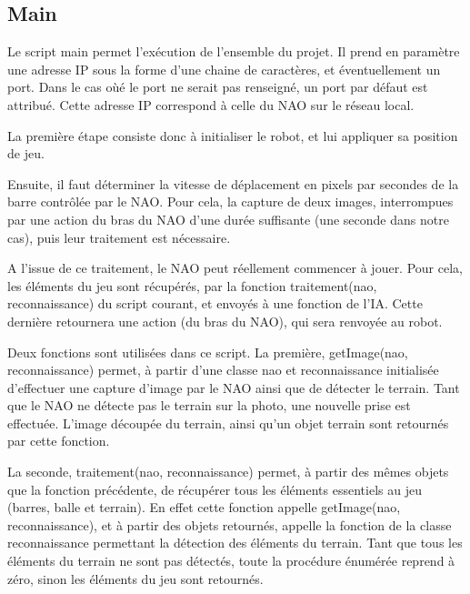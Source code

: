 \subsection{Main}
\label{sub:Main}

  \par Le script main permet l'exécution de l'ensemble du projet.
  Il prend en paramètre une adresse IP sous la forme d'une chaine de caractères, et éventuellement un port.
  Dans le cas oùé le port ne serait pas renseigné, un port par défaut est attribué.
  Cette adresse IP correspond à celle du NAO sur le réseau local.
  \par La première étape consiste donc à initialiser le robot, et lui appliquer sa position de jeu.
  \par Ensuite, il faut déterminer la vitesse de déplacement en pixels par secondes de la barre contrôlée par le NAO.
  Pour cela, la capture de deux images, interrompues par une action du bras du NAO d'une durée suffisante (une seconde dans notre cas), puis leur traitement est nécessaire.
  \par A l'issue de ce traitement, le NAO peut réellement commencer à jouer.
  Pour cela, les éléments du jeu sont récupérés, par la fonction traitement(nao, reconnaissance) du script courant, et envoyés à une fonction de l'IA.
  Cette dernière retournera une action (du bras du NAO), qui sera renvoyée au robot.

  \par Deux fonctions sont utilisées dans ce script.
  La première, getImage(nao, reconnaissance) permet, à partir d'une classe nao et reconnaissance initialisée d'effectuer une capture d'image par le NAO ainsi que de détecter le terrain.
  Tant que le NAO ne détecte pas le terrain sur la photo, une nouvelle prise est effectuée.
  L'image découpée du terrain, ainsi qu'un objet terrain sont retournés par cette fonction.
  \par La seconde, traitement(nao, reconnaissance) permet, à partir des mêmes objets que la fonction précédente, de récupérer tous les éléments essentiels au jeu (barres, balle et terrain).
  En effet cette fonction appelle getImage(nao, reconnaissance), et à partir des objets retournés, appelle la fonction de la classe reconnaissance permettant la détection des éléments du terrain.
  Tant que tous les éléments du terrain ne sont pas détectés, toute la procédure énumérée reprend à zéro, sinon les éléments du jeu sont retournés.
\pagebreak

